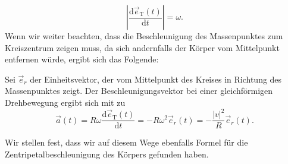 \begin{MExtra}
  \begin{equation}\left\vert\frac{\textrm{d}\vec{e}_{\textrm{T}}(t)}{\textrm{d}t}\right\vert=\omega. 
  \end{equation}Wenn wir weiter beachten, dass die Beschleunigung des Massenpunktes zum Kreiszentrum zeigen muss, da sich andernfalls der K\"orper vom Mittelpunkt entfernen w\"urde, ergibt sich das Folgende:
  
  \begin{MInfo}
   Sei $\vec{e}_r$ der Einheitsvektor, der vom Mittelpunkt des Kreises in Richtung des Massenpunktes zeigt. Der Beschleunigungsvektor bei einer gleichf\"ormigen Drehbewegung ergibt sich mit  zu
  \begin{equation*}
  \vec{a}(t)=R\omega\frac{\textrm{d}\vec{e}_{\textrm{T}}(t)}{\textrm{d}t}=-R\omega^2\vec{e}_r(t)=-\frac{\vert v\vert^2}{R}\vec{e}_r(t).
  \end{equation*} 
  \end{MInfo}
  Wir stellen fest, dass wir auf diesem Wege ebenfalls Formel  f\"ur die Zentripetalbeschleunigung des K\"orpers gefunden haben.
  
  \end{MExtra}
  

